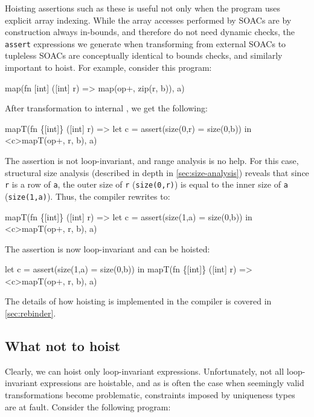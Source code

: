 Hoisting assertions such as these is useful not only when the program
uses explicit array indexing.  While the array accesses performed by
SOACs are by construction always in-bounds, and therefore do not need
dynamic checks, the \texttt{assert} expressions we generate when
transforming from external SOACs to tupleless SOACs are conceptually
identical to bounds checks, and similarly important to hoist.  For
example, consider this program:

\begin{colorcode}
map(fn [int] ([int] r) =>
      map(op+, zip(r, b)),
    a)
\end{colorcode}

After transformation to internal \LO{}, we get the following:

\begin{colorcode}
mapT(fn \{[int]\} ([int] r) =>
       let c = assert(size(0,r) = size(0,b)) in
       <c>mapT(op+, r, b),
    a)
\end{colorcode}

The assertion is not loop-invariant, and range analysis is no help.
For this case, structural size analysis (described in depth in
\cref{sec:size-analysis}) reveals that since \texttt{r} is a row of
\texttt{a}, the outer size of \texttt{r} (\texttt{size(0,r)}) is equal
to the inner size of \texttt{a} (\texttt{size(1,a)}).  Thus, the
compiler rewrites to:

\begin{colorcode}
mapT(fn \{[int]\} ([int] r) =>
       let c = assert(size(1,a) = size(0,b)) in
       <c>mapT(op+, r, b),
    a)
\end{colorcode}

The assertion is now loop-invariant and can be hoisted:

\begin{colorcode}
let c = assert(size(1,a) = size(0,b)) in
mapT(fn \{[int]\} ([int] r) =>
       <c>mapT(op+, r, b),
    a)
\end{colorcode}

The details of how hoisting is implemented in the \LO{} compiler is
covered in \cref{sec:rebinder}.

\subsection{What not to hoist}
\label{sec:when-not-to-hoist}

Clearly, we can hoist only loop-invariant expressions.  Unfortunately,
not all loop-invariant expressions are hoistable, and as is often the
case when seemingly valid transformations become problematic,
constraints imposed by uniqueness types are at fault.  Consider the
following program:

